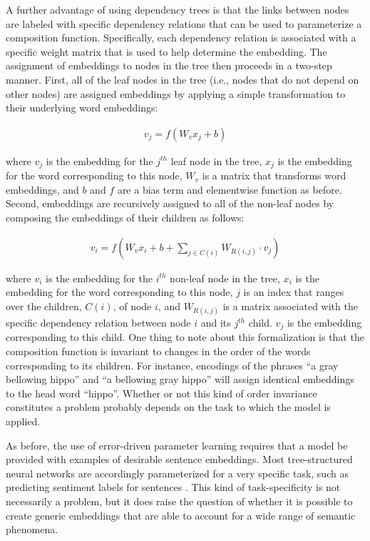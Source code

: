 A further advantage of using dependency trees is that the links between nodes are labeled with specific dependency relations that can be used to parameterize a composition function. Specifically, each dependency relation is associated with a specific weight matrix that is used to help determine the embedding. The assignment of embeddings to nodes in the tree then proceeds in a two-step manner. First, all of the leaf nodes in the tree (i.e., nodes that do not depend on other nodes) are assigned embeddings by applying a simple transformation to their underlying word embeddings:

\begin{align} 
\label{eqn:dt_rnn_leaf}
v_j = f (W_v x_j + b) 
\end{align}

\noindent
where $v_j$ is the embedding for the $j^{th}$ leaf node in the tree, $x_j$ is the embedding for the word corresponding to this node, $W_v$ is a matrix that transforms word embeddings, and $b$ and $f$ are a bias term and elementwise function as before. Second, embeddings are recursively assigned to all of the non-leaf nodes by composing the embeddings of their children as follows:

\begin{align}
\label{eqn:dt_rnn_nonleaf}
v_i = f (W_v x_i + b + \sum_{j \in C(i)} W_{R(i,j)} \cdot v_j )
\end{align}

\noindent
where $v_i$ is the embedding for the $i^{th}$ non-leaf node in the tree, $x_i$ is the embedding for the word corresponding to this node, $j$ is an index that ranges over the children, $C(i)$, of node $i$, and $W_{R(i, j)}$ is a matrix associated with the specific dependency relation between node $i$ and its $j^{th}$ child. $v_j$ is the embedding corresponding to this child. One thing to note about this formalization is that the composition function is invariant to changes in the order of the words corresponding to its children. For instance, encodings of the phrases ``a gray bellowing hippo'' and ``a bellowing gray hippo'' will assign identical embeddings to the head word ``hippo''. Whether or not this kind of order invariance constitutes a problem probably depends on the task to which the model is applied.

As before, the use of error-driven parameter learning requires that a model be provided with examples of desirable sentence embeddings. Most tree-structured neural networks are accordingly parameterized for a very specific task, such as predicting sentiment labels for sentences \citep{Socher:2011,Socher:2012}. This kind of task-specificity is not necessarily a problem, but it does raise the question of whether it is possible to create generic embeddings that are able to account for a wide range of semantic phenomena.

